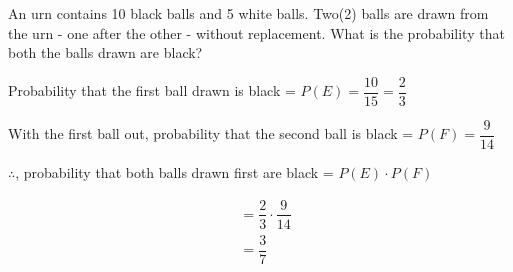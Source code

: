 	\question[5] An urn contains 10 black balls and 5 white balls. Two(2) balls are
  drawn from the urn - one after the other - without replacement. What is the 
  probability that both the balls drawn are black?
  \begin{solution}[\halfpage]
    Probability that the first ball drawn is black = $P(E) = \dfrac{10}{15} = \dfrac{2}{3}$
    
    With the first ball out, probability that the second ball is black = $P(F) =
    \dfrac{9}{14}$

    $\therefore$, probability that both balls drawn first are black = $P(E)\cdot P(F)$

    \begin{align}
      &= \dfrac{2}{3} \cdot \dfrac{9}{14} \\
      &= \dfrac{3}{7}
    \end{align}
   \end{solution} 
